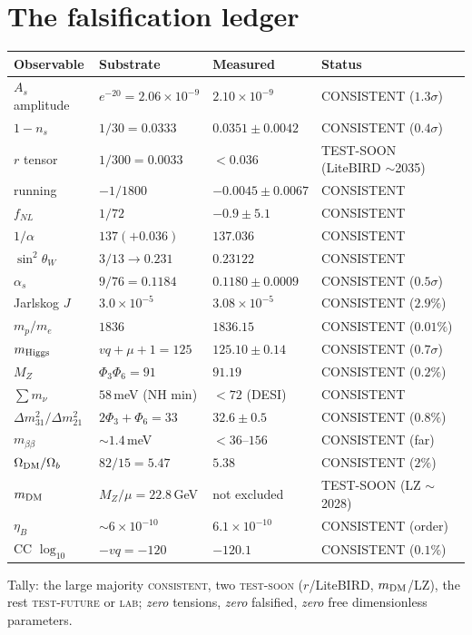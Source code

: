 \documentclass[11pt]{article}
\begin{document}
\section{The falsification ledger}
\begin{center}\small
\begin{longtable}{lll l}
\toprule
Observable & Substrate & Measured & Status\\ \midrule
$A_s$ amplitude & $e^{-20}=2.06\times10^{-9}$ & $2.10\times10^{-9}$ & CONSISTENT ($1.3\sigma$)\\
$1-n_s$ & $1/30=0.0333$ & $0.0351\pm0.0042$ & CONSISTENT ($0.4\sigma$)\\
$r$ tensor & $1/300=0.0033$ & $<0.036$ & TEST-SOON (LiteBIRD $\sim$2035)\\
running & $-1/1800$ & $-0.0045\pm0.0067$ & CONSISTENT\\
$f_{NL}$ & $1/72$ & $-0.9\pm5.1$ & CONSISTENT\\
$1/\alpha$ & $137(+0.036)$ & $137.036$ & CONSISTENT\\
$\sin^2\theta_W$ & $3/13\to0.231$ & $0.23122$ & CONSISTENT\\
$\alpha_s$ & $9/76=0.1184$ & $0.1180\pm0.0009$ & CONSISTENT ($0.5\sigma$)\\
Jarlskog $J$ & $3.0\times10^{-5}$ & $3.08\times10^{-5}$ & CONSISTENT ($2.9\%$)\\
$m_p/m_e$ & $1836$ & $1836.15$ & CONSISTENT ($0.01\%$)\\
$m_{\rm Higgs}$ & $vq{+}\mu{+}1=125$ & $125.10\pm0.14$ & CONSISTENT ($0.7\sigma$)\\
$M_Z$ & $\Phi_3\Phi_6=91$ & $91.19$ & CONSISTENT ($0.2\%$)\\
$\sum m_\nu$ & $58$\,meV (NH min) & $<72$ (DESI) & CONSISTENT\\
$\Delta m^2_{31}/\Delta m^2_{21}$ & $2\Phi_3{+}\Phi_6=33$ & $32.6\pm0.5$ & CONSISTENT ($0.8\%$)\\
$m_{\beta\beta}$ & $\sim1.4$\,meV & $<36$--$156$ & CONSISTENT (far)\\
$\Omega_{\rm DM}/\Omega_b$ & $82/15=5.47$ & $5.38$ & CONSISTENT ($2\%$)\\
$m_{\rm DM}$ & $M_Z/\mu=22.8$\,GeV & not excluded & TEST-SOON (LZ $\sim$2028)\\
$\eta_B$ & $\sim6\times10^{-10}$ & $6.1\times10^{-10}$ & CONSISTENT (order)\\
CC $\log_{10}$ & $-vq=-120$ & $-120.1$ & CONSISTENT ($0.1\%$)\\
\bottomrule
\end{longtable}
\end{center}
\noindent Tally: the large majority \textsc{consistent}, two \textsc{test-soon}
($r$/LiteBIRD, $m_{\rm DM}$/LZ), the rest \textsc{test-future} or \textsc{lab}; \emph{zero}
tensions, \emph{zero} falsified, \emph{zero} free dimensionless parameters.
\end{document}
